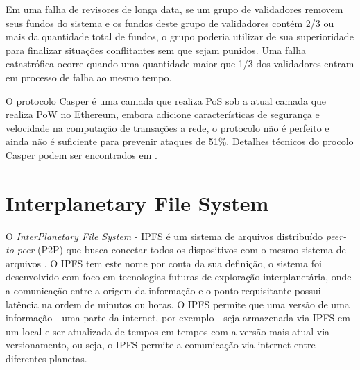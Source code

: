 \documentclass[tcc,capa]{texufpel}
\begin{document}
    Em uma falha de revisores de longa data, se um grupo de validadores removem seus fundos do sistema e os fundos deste grupo de validadores contém 2/3 ou mais da quantidade total de fundos, o grupo poderia utilizar de sua superioridade para finalizar situações conflitantes sem que sejam punidos. Uma falha catastrófica ocorre quando uma quantidade maior que 1/3 dos validadores entram em processo de falha ao mesmo tempo.
    
    O protocolo Casper é uma camada que realiza PoS sob a atual camada que realiza PoW no Ethereum, embora adicione características de segurança e velocidade na computação de transações a rede, o protocolo não é perfeito e ainda não é suficiente para prevenir ataques de 51\%. Detalhes técnicos do procolo Casper podem ser encontrados em \cite{buterin2017}.
    
    

    
    
    
    
    
\section{Interplanetary File System}

    O \textit{InterPlanetary File System} - IPFS é um sistema de arquivos distribuído \textit{peer-to-peer} (P2P) que busca conectar todos os dispositivos com o mesmo sistema de arquivos \cite{benet2014ipfs}. O IPFS tem este nome por conta da sua definição, o sistema foi desenvolvido com foco em tecnologias futuras de exploração interplanetária, onde a comunicação entre a origem da informação e o ponto requisitante possui latência na ordem de minutos ou horas. O IPFS permite que uma versão de uma informação - uma parte da internet, por exemplo - seja armazenada via IPFS em um local e ser atualizada de tempos em tempos com a versão mais atual via versionamento, ou seja, o IPFS permite a comunicação via internet entre diferentes planetas.
    
\end{document}
